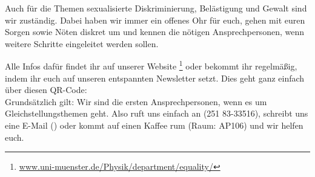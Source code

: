 \begin{multicols}{2}
Auch für die Themen sexualisierte Diskriminierung, Belästigung und Gewalt sind wir zuständig. Dabei haben wir immer ein offenes Ohr für euch, gehen mit euren Sorgen sowie Nöten diskret um und kennen die nötigen Ansprechpersonen, wenn weitere Schritte eingeleitet werden sollen.

Alle Infos dafür findet ihr auf unserer Website \footnote{\url{www.uni-muenster.de/Physik/department/equality/}} oder bekommt ihr regelmäßig, indem ihr euch auf unseren entspannten Newsletter setzt. Dies geht ganz einfach über diesen QR-Code: \\

Grundsätzlich gilt: Wir sind die ersten Ansprechpersonen, wenn es um Gleichstellungsthemen geht. Also ruft uns einfach an (251 83-33516), schreibt uns eine E-Mail (\textbf{}) oder kommt auf einen Kaffee rum (Raum: AP106) und wir helfen euch.


\end{multicols}


